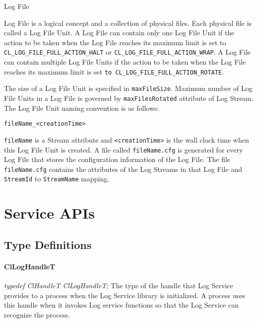 \begin{flushleft}
\begin{Desc}
\item[Log File]
\end{Desc}

Log File is a logical concept and a collection of physical files. Each physical file is called a Log File Unit. 
A Log File can contain only one Log File Unit if the action to be taken when the Log File 
reaches its maximum limit is set to {\tt{CL\_\-LOG\_\-FILE\_\-FULL\_\-ACTION\_\-HALT}} or {\tt{CL\_\-LOG\_\-FILE\_\-FULL\_\-ACTION\_\-WRAP}}.
A Log File can contain multiple Log File Units if the action to be taken when the Log File 
reaches its maximum limit is set {\tt{to CL\_\-LOG\_\-FILE\_\-FULL\_\-ACTION\_\-ROTATE}}.
\par
The size of a Log File Unit is specified in {\tt{maxFileSize}}. Maximum number of Log File Units in a Log File is governed by {\tt{maxFilesRotated}}
attribute of Log Stream. The Log File Unit naming convention is as follows: \par
{\tt{fileName\_\-<creationTime>}}
\par
{\tt{fileName}} is a Stream attribute and {\tt{<creationTime>}} is the
wall clock time when this Log File Unit is created. A file called {\tt{fileName.cfg}} is generated for every Log File that stores the 
configuration information of the Log File. The file {\tt{fileName.cfg}} contains the attributes of the Log Streams in that Log File and 
{\tt{StreamId}} to {\tt{StreamName}} mapping.






\chapter{Service APIs}

\section{Type Definitions}

\subsubsection{ClLogHandleT}
\textit{typedef ClHandleT ClLogHandleT;}
\newline
\newline
The type of the handle that Log Service provides to a process when the Log Service library is initialized. 
A process uses this handle when it invokes Log service functions so that the Log Service can recognize the process.



\end{flushleft}
